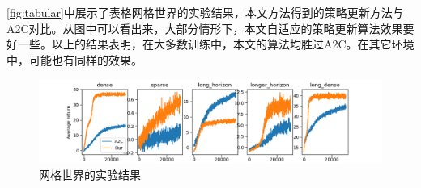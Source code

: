 \autoref{fig:tabular}中展示了表格网格世界的实验结果，本文方法得到的策略更新方法与A2C对比。从图中可以看出来，大部分情形下，本文自适应的策略更新算法效果要好一些。以上的结果表明，在大多数训练中，本文的算法均胜过A2C。在其它环境中，可能也有同样的效果。

\begin{figure}[h!]
    \centering
    \includegraphics[width=\textwidth]{image/chap04/tabular.png}
    \caption{网格世界的实验结果}
    \label{fig:tabular}
\end{figure}
